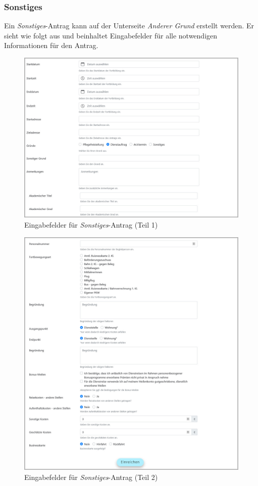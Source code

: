 \subsubsection{Sonstiges}
Ein \textit{Sonstiges}-Antrag kann auf der Unterseite \textit{Anderer Grund} erstellt werden. Er sieht wie folgt aus und beinhaltet Eingabefelder für alle notwendigen Informationen für den Antrag.
\begin{figure}[H]
	\centering
	\includegraphics[width=1\linewidth]{images/rfoster_implementierung/othercause1}
	\caption[Sonstiges-Antrag Informationen eingeben (Teil 1)]{Eingabefelder für \textit{Sonstiges}-Antrag (Teil 1)}
	\label{fig:othercause1}
\end{figure}
\begin{figure}[H]
	\centering
	\includegraphics[width=1\linewidth]{images/rfoster_implementierung/othercause2}
	\caption[Sonstiges-Antrag Informationen eingeben (Teil 2)]{Eingabefelder für \textit{Sonstiges}-Antrag (Teil 2)}
	\label{fig:othercause2}
\end{figure}
